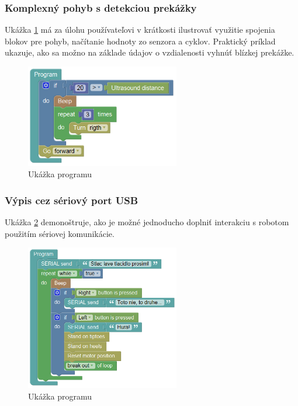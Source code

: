 \subsubsection{Komplexný pohyb s detekciou prekážky}

Ukážka \ref{obr:avoid-collision} má za úlohu používateľovi v krátkosti ilustrovať využitie spojenia blokov pre pohyb, načítanie hodnoty zo senzora a cyklov. Praktický príklad ukazuje, ako sa možno na základe údajov o vzdialenosti vyhnúť blízkej prekážke.

\begin{figure}[h!]
\centerline{\includegraphics[width=0.6\textwidth]{images/avoid-collision}}
\caption[Ukážka programu ]{Ukážka programu }
\label{obr:avoid-collision}
\end{figure}

\subsubsection{Výpis cez sériový port USB}

Ukážka \ref{obr:push-button} demonoštruje, ako je možné jednoducho doplniť interakciu s robotom použitím sériovej komunikácie.

\begin{figure}[h!]
\centerline{\includegraphics[width=0.6\textwidth]{images/push-button}}
\caption[Ukážka programu ]{Ukážka programu }
\label{obr:push-button}
\end{figure}

